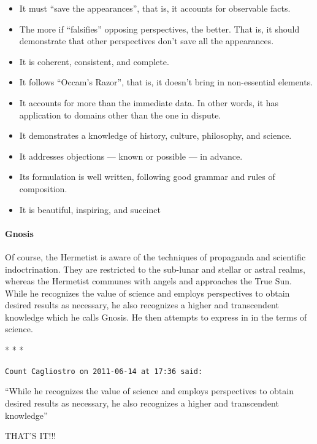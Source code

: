 \begin{itemize}


\item It must ``save the appearances'', that is, it accounts for observable facts.

\item The more if ``falsifies'' opposing perspectives, the better. That is, it should demonstrate that other perspectives don't save all the appearances.

\item It is coherent, consistent, and complete.

\item It follows ``Occam's Razor'', that is, it doesn't bring in non-essential elements.

\item It accounts for more than the immediate data. In other words, it has application to domains other than the one in dispute.

\item It demonstrates a knowledge of history, culture, philosophy, and science.

\item It addresses objections --- known or possible --- in advance.

\item Its formulation is well written, following good grammar and rules of composition.

\item It is beautiful, inspiring, and succinct
\end{itemize}


\paragraph{Gnosis}


Of course, the Hermetist is aware of the techniques of propaganda and scientific indoctrination. They are restricted to the sub-lunar and stellar or astral realms, whereas the Hermetist communes with angels and approaches the True Sun. While he recognizes the value of science and employs perspectives to obtain desired results as necessary, he also recognizes a higher and transcendent knowledge which he calls Gnosis. He then attempts to express in in the terms of science.



\begin{center}* * *\end{center}

\begin{footnotesize}
\begin{sffamily}
\texttt{Count Cagliostro on 2011-06-14 at 17:36 said:}

``While he recognizes the value of science and employs perspectives to obtain desired results as necessary, he also recognizes a higher and transcendent knowledge''

THAT'S IT!!!

\end{sffamily}
\end{footnotesize}

